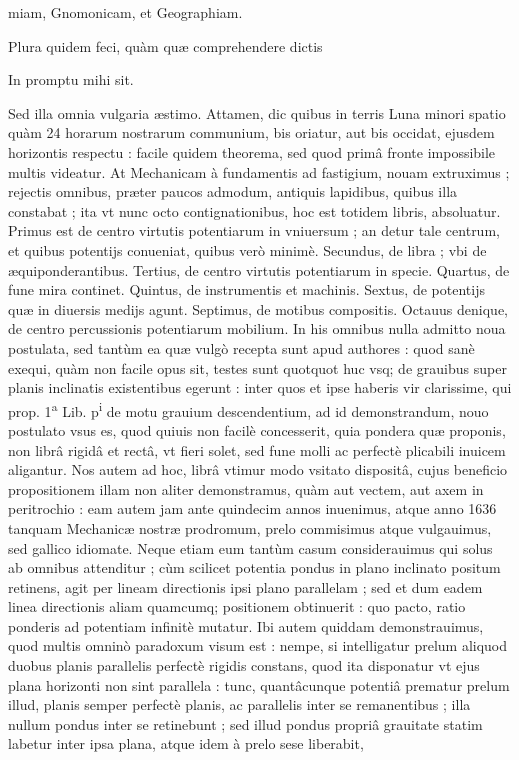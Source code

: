 \documentclass[11pt,a4paper]{article}
\begin{document}

miam, Gnomonicam, et Geographiam.

Plura quidem feci, quàm quæ comprehendere dictis

In promptu mihi sit.

Sed illa omnia vulgaria æstimo. Attamen, dic quibus in terris Luna minori spatio quàm 24 horarum nostrarum communium, bis oriatur, aut bis occidat, ejusdem horizontis respectu : facile quidem theorema, sed quod primâ fronte impossibile multis videatur. At Mechanicam à fundamentis ad fastigium, nouam extruximus ; rejectis omnibus, præter paucos admodum, antiquis lapidibus, quibus illa constabat ; ita vt nunc octo contignationibus, hoc est totidem libris, absoluatur. Primus est de centro virtutis potentiarum in vniuersum ; an detur tale centrum, et quibus potentijs conueniat, quibus verò minimè. Secundus, de libra ; vbi de æquiponderantibus. Tertius, de centro virtutis potentiarum in specie. Quartus, de fune mira continet. Quintus, de instrumentis et machinis. Sextus, de potentijs quæ in diuersis medijs agunt. Septimus, de motibus compositis. Octauus denique, de centro percussionis potentiarum mobilium. In his omnibus nulla admitto noua postulata, sed tantùm ea quæ vulgò recepta sunt apud authores : quod sanè exequi, quàm non facile opus sit, testes sunt quotquot huc vsq; de grauibus super planis inclinatis existentibus egerunt : inter quos et ipse haberis vir clarissime, qui prop. 1\textsuperscript{a} Lib. p\textsuperscript{i} de motu grauium descendentium, ad id demonstrandum, nouo postulato vsus es, quod quiuis non facilè concesserit, quia pondera quæ proponis, non librâ rigidâ et rectâ, vt fieri solet, sed fune molli ac perfectè plicabili inuicem aligantur. Nos autem ad hoc, librâ vtimur modo vsitato dispositâ, cujus beneficio propositionem illam non aliter demonstramus, quàm aut vectem, aut axem in peritrochio : eam autem jam ante quindecim annos inuenimus, atque anno 1636 tanquam Mechanicæ nostræ prodromum, prelo commisimus atque vulgauimus, sed gallico idiomate. Neque etiam eum tantùm casum considerauimus qui solus ab omnibus attenditur ; cùm scilicet potentia pondus in plano inclinato positum retinens, agit per lineam directionis ipsi plano parallelam ; sed et dum eadem linea directionis aliam quamcumq; positionem obtinuerit : quo pacto, ratio ponderis ad potentiam infinitè mutatur. Ibi autem quiddam demonstrauimus, quod multis omninò paradoxum visum est : nempe, si intelligatur prelum aliquod duobus planis parallelis perfectè rigidis constans, quod ita disponatur vt ejus plana horizonti non sint parallela : tunc, quantâcunque potentiâ prematur prelum illud, planis semper perfectè planis, ac parallelis inter se remanentibus ; illa nullum pondus inter se retinebunt ; sed illud pondus propriâ grauitate statim labetur inter ipsa plana, atque idem à prelo sese liberabit,
\end{document}
